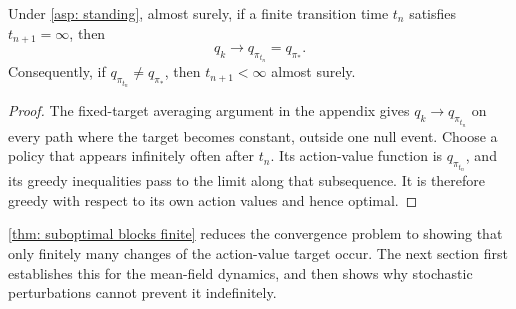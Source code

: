 \begin{lemma}
\label{thm: suboptimal blocks finite}
Under \autoref{asp: standing}, almost surely, if a finite transition time $t_n$ satisfies $t_{n+1}=\infty$, then
\[
q_k\longrightarrow q_{\pi_{t_n}}=q_{\pi_*}.
\]
Consequently, if $q_{\pi_{t_n}}\ne q_{\pi_*}$, then $t_{n+1}<\infty$ almost surely.
\end{lemma}
\begin{proof}
The fixed-target averaging argument in the appendix gives $q_k\to q_{\pi_{t_n}}$ on every path where the target becomes constant, outside one null event.
Choose a policy that appears infinitely often after $t_n$. Its action-value function is $q_{\pi_{t_n}}$, and its greedy inequalities pass to the limit along that subsequence. It is therefore greedy with respect to its own action values and hence optimal.
\end{proof}

\autoref{thm: suboptimal blocks finite} reduces the convergence problem to showing that only finitely many changes of the action-value target occur. The next section first establishes this for the mean-field dynamics, and then shows why stochastic perturbations cannot prevent it indefinitely.
